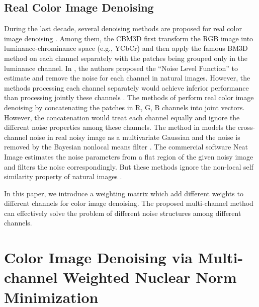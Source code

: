 \documentclass[10pt,twocolumn,letterpaper,sort&compress]{article}
\begin{document}
\subsection{Real Color Image Denoising}
During the last decade, several denoising methods are proposed for real color image denoising \cite{cbm3d,Liu2008,Zhu_2016_CVPR,noiseclinic}. Among them, the CBM3D \cite{cbm3d} first transform the RGB image into luminance-chrominance space (e.g., YCbCr) and then apply the famous BM3D method \cite{bm3d} on each channel separately with the patches being grouped only in the luminance channel. In \cite{Liu2008}, the authors proposed the ``Noise Level Function'' to estimate and remove the noise for each channel in natural images. However, the methods processing each channel separately would achieve inferior performance than processing jointly these channels \cite{mairal2008sparse}. The methods of \cite{noiseclinic,ncwebsite,Zhu_2016_CVPR} perform real color image denoising by concatenating the patches in R, G, B channels into joint vectors. However, the concatenation would treat each channel equally and ignore the different noise properties among these channels. The method in \cite{crosschannel2016} models the cross-channel noise in real noisy image as a multivariate Gaussian and the noise is removed by the Bayesian nonlocal means filter \cite{kervrann2007bayesian}. The commercial software Neat Image \cite{neatimage} estimates the noise parameters from a flat region of the given noisy image and filters the noise correspondingly. But these methods \cite{crosschannel2016,neatimage} ignore the non-local self similarity property of natural images \cite{bm3d,wnnm}. 

In this paper, we introduce a weighting matrix which add different weights to different channels for color image denoising. The proposed multi-channel method can effectively solve the problem of different noise structures among different channels.

\section{Color Image Denoising via Multi-channel Weighted Nuclear Norm Minimization}
\end{document}
